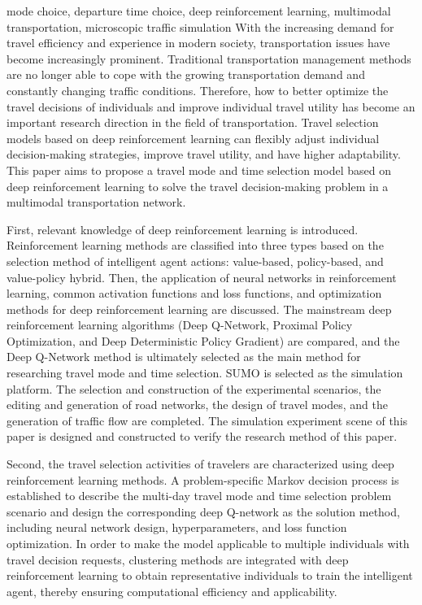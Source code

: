 \begin{englishabstract}{mode choice, departure time choice, deep reinforcement learning, multimodal transportation, microscopic traffic simulation}
With the increasing demand for travel efficiency and experience in modern society, transportation issues have become increasingly prominent. Traditional transportation management methods are no longer able to cope with the growing transportation demand and constantly changing traffic conditions. Therefore, how to better optimize the travel decisions of individuals and improve individual travel utility has become an important research direction in the field of transportation. Travel selection models based on deep reinforcement learning can flexibly adjust individual decision-making strategies, improve travel utility, and have higher adaptability. This paper aims to propose a travel mode and time selection model based on deep reinforcement learning to solve the travel decision-making problem in a multimodal transportation network.

First, relevant knowledge of deep reinforcement learning is introduced. Reinforcement learning methods are classified into three types based on the selection method of intelligent agent actions: value-based, policy-based, and value-policy hybrid. Then, the application of neural networks in reinforcement learning, common activation functions and loss functions, and optimization methods for deep reinforcement learning are discussed. The mainstream deep reinforcement learning algorithms (Deep Q-Network, Proximal Policy Optimization, and Deep Deterministic Policy Gradient) are compared, and the Deep Q-Network method is ultimately selected as the main method for researching travel mode and time selection. SUMO is selected as the simulation platform. The selection and construction of the experimental scenarios, the editing and generation of road networks, the design of travel modes, and the generation of traffic flow are completed. The simulation experiment scene of this paper is designed and constructed to verify the research method of this paper.

Second, the travel selection activities of travelers are characterized using deep reinforcement learning methods. A problem-specific Markov decision process is established to describe the multi-day travel mode and time selection problem scenario and design the corresponding deep Q-network as the solution method, including neural network design, hyperparameters, and loss function optimization. In order to make the model applicable to multiple individuals with travel decision requests, clustering methods are integrated with deep reinforcement learning to obtain representative individuals to train the intelligent agent, thereby ensuring computational efficiency and applicability.


\end{englishabstract}
